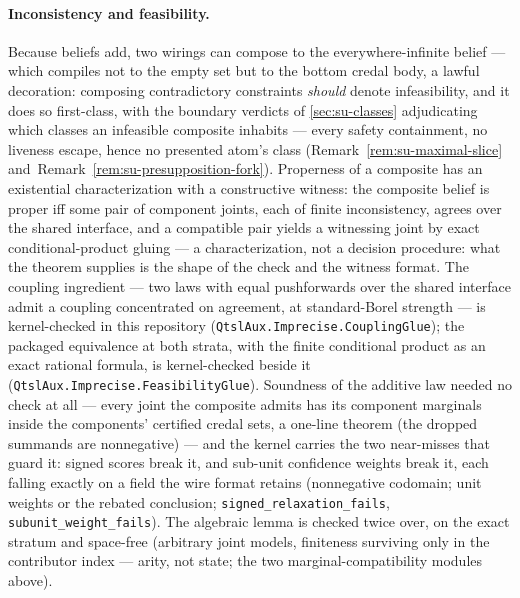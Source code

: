 \paragraph{Inconsistency and feasibility.} Because beliefs add,
two wirings can compose to the everywhere-infinite belief --- which
compiles not to the empty set but to the bottom credal body, a
lawful decoration: composing contradictory constraints \emph{should}
denote infeasibility, and it does so first-class, with the
boundary verdicts of \autoref{sec:su-classes}
adjudicating which classes an infeasible composite inhabits ---
every safety containment, no liveness escape, hence no presented
atom's class (Remark~\ref{rem:su-maximal-slice}
and~Remark~\ref{rem:su-presupposition-fork}).
Properness of a
composite has an existential characterization with a constructive
witness: the composite belief is proper iff some pair of
component joints, each of finite inconsistency, agrees over the
shared interface,
and a compatible pair yields a witnessing joint by exact
conditional-product gluing --- a characterization, not a decision
procedure: what the theorem supplies is the shape of the check and
the witness format. The coupling ingredient --- two laws with equal
pushforwards over the shared interface admit a coupling concentrated
on agreement, at standard-Borel strength --- is kernel-checked in
this repository (\texttt{QtslAux.Imprecise.CouplingGlue}); the
packaged equivalence at both strata, with the finite conditional
product as an exact rational formula, is kernel-checked beside it
(\texttt{QtslAux.Imprecise.FeasibilityGlue}). Soundness of the additive law needed no check
at all --- every joint the composite admits has its component
marginals inside the components' certified credal sets, a one-line
theorem (the dropped summands are nonnegative) --- and the kernel
carries the two near-misses that guard it: signed scores break
it, and sub-unit confidence weights break it, each falling exactly
on a field the wire format retains (nonnegative codomain; unit
weights or the rebated conclusion;
\texttt{signed\_relaxation\_fails},
\texttt{subunit\_weight\_fails}). The algebraic lemma is checked
twice over, on the exact stratum and space-free (arbitrary joint
models, finiteness surviving only in the contributor index ---
arity, not state; the two marginal-compatibility modules above).

